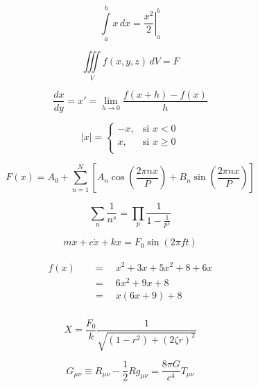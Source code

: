 \documentclass{article}
\begin{document}
  \begin{equation}
    \int\limits_{a}^{b} x\,dx = \left.\frac{x^2}{2}\right|_{a}^{b}
  \end{equation}

  \begin{equation}
    \iiint\limits_{V} f(x, y, z)\,dV = F
  \end{equation}

  \begin{equation}
    \frac{dx}{dy} = x\prime = \lim_{h \to 0} \frac{f(x+h)-f(x)}{h}
  \end{equation}

  \begin{equation}
    |x| = \begin{cases}
      -x, & \text{si } x < 0 \\
      x,  & \text{si } x \geq 0 \\
    \end{cases}
  \end{equation}

  \begin{equation}
    F(x) = A_0 + \sum_{n=1}^{N} \left[A_n \cos\left(\frac{2\pi nx}{P}\right) + B_n \sin\left(\frac{2\pi nx}{P}\right)\right]
  \end{equation}

  \begin{equation}
    \sum_{n} \frac{1}{n^s} = \prod_{p}\frac{1}{1 - \frac{1}{p^s}}
  \end{equation}

  \begin{equation}
    m\ddot{x} + c\dot{x} + kx = F_0 \sin(2\pi ft)
  \end{equation}
  
  \begin{align}
    \begin{split}
      f(x) \quad &= \quad x^2 + 3x + 5x^2 + 8 + 6x \\
           \quad &= \quad 6x^2 + 9x + 8 \\
           \quad &= \quad x(6x + 9) + 8 \\
    \end{split}
  \end{align}

  \begin{equation}
    X = \frac{F_0}{k}\frac{1}{\sqrt{(1 - r^2) + (2 \zeta r)^2}}
  \end{equation}

  \begin{equation}
    G_{\mu\nu} \equiv R_{\mu\nu} - \frac{1}{2}Rg_{\mu\nu} = \frac{8\pi G}{c^4}T_{\mu\nu}
  \end{equation}
\end{document}
